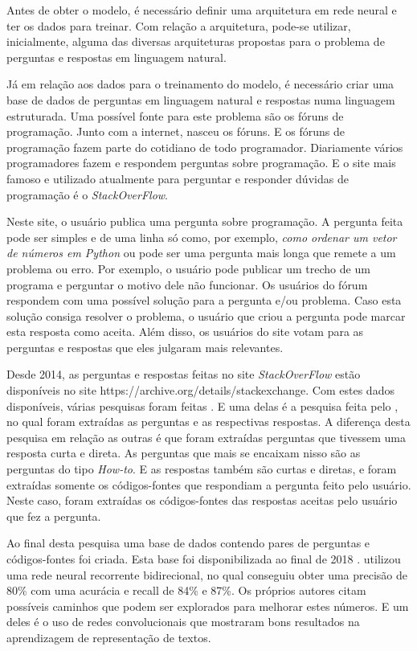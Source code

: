 Antes de obter o modelo, é necessário definir uma arquitetura em rede neural e ter os dados para treinar. Com relação a arquitetura, pode-se utilizar, inicialmente, alguma das diversas arquiteturas propostas para o problema de perguntas e respostas em linguagem natural. 

Já em relação aos dados para o treinamento do modelo, é necessário criar uma base de dados de perguntas em linguagem natural e respostas numa linguagem estruturada. Uma possível fonte para este problema são os fóruns de programação. Junto com a internet, nasceu os fóruns. E os fóruns de programação fazem parte do cotidiano de todo programador. Diariamente vários programadores fazem e respondem perguntas sobre programação. E o site mais famoso e utilizado atualmente para perguntar e responder dúvidas de programação é o \textit{StackOverFlow}. 

Neste site, o usuário publica uma pergunta sobre programação. A pergunta feita pode ser simples e de uma linha só como, por exemplo, \textit{como ordenar um vetor de números em Python} ou pode ser uma pergunta mais longa que remete a um problema ou erro. Por exemplo, o usuário pode publicar um trecho de um programa e perguntar o motivo dele não funcionar. Os usuários do fórum respondem com uma possível solução para a pergunta e/ou problema. Caso esta solução consiga resolver o problema, o usuário que criou a pergunta pode marcar esta resposta como aceita. Além disso, os usuários do site votam para as perguntas e respostas que eles julgaram mais relevantes. 

Desde 2014, as perguntas e respostas feitas no site \textit{StackOverFlow} estão disponíveis no site https://archive.org/details/stackexchange. Com estes dados disponíveis, várias pesquisas foram feitas . E uma delas é a pesquisa feita pelo \cite{yao-2018}, no qual foram extraídas as perguntas e as respectivas respostas. A diferença desta pesquisa em relação as outras é que foram extraídas perguntas que tivessem uma resposta curta e direta. As perguntas que mais se encaixam nisso são as perguntas do tipo \textit{How-to}. E as respostas também são curtas e diretas, e foram extraídas somente os códigos-fontes que respondiam a pergunta feito pelo usuário. Neste caso, foram extraídas os códigos-fontes das respostas aceitas pelo usuário que fez a pergunta. 

Ao final desta pesquisa uma base de dados contendo pares de perguntas e códigos-fontes foi criada. Esta base foi disponibilizada ao final de 2018 \cite{yao-2018}. \citeauthor{yao-2018} utilizou uma rede neural recorrente bidirecional, no qual conseguiu obter uma precisão de 80\% com uma acurácia e recall de 84\% e 87\%. Os próprios autores citam possíveis caminhos que podem ser explorados para melhorar estes números. E um deles é o uso de redes convolucionais que mostraram bons resultados na aprendizagem de representação de textos.

